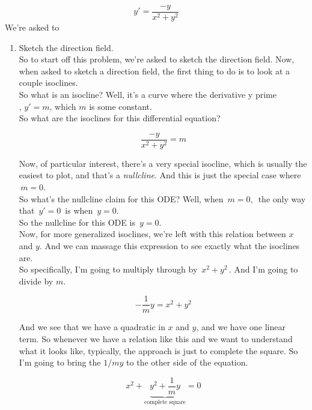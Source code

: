 \begin{equation*}
  y' = \frac{-y}{x^2 + y^2}
\end{equation*}
We're asked to

\begin{enumerate}
\item Sketch the direction field. \\
  So to start off this problem, we're
  asked to sketch the direction field.
  Now, when asked to sketch a direction field,
  the first thing to do is to look at a couple isoclines.\\
  So what is an isocline?
  Well, it's a curve where the derivative y
  prime $,\,y' = m, \,$which $m$ is some constant.\\
  So what are the isoclines for this differential equation?
  
  \begin{equation*}
    \frac{-y}{x^2 + y^2} = m 
  \end{equation*}

  Now, of particular interest, there's
  a very special isocline, which is usually the easiest to plot,
  and that's a \emph{nullcline}.
  And this is just the special case where $\, m = 0$.\\
  So what's the nullcline claim for this ODE?
  Well, when $\, m = 0, \,$ the only way that $\,y' = 0 \,$
  is when $\,y  = 0$.\\
  So the nullcline for this ODE is $\,y = 0$. \\
  Now, for more generalized isoclines,
  we're left with this relation between $x$ and $y$.
  And we can massage this expression to see exactly what the isoclines are.\\
  So specifically, I'm going to multiply through
  by $\, x^2 + y^2\,$.
  And I'm going to divide by $m$.
  
  \begin{equation*}
    -\frac{1}{m}y = x^2 + y^2
  \end{equation*}
  
  And we see that we have a quadratic in $x$ and $y$, and we have one linear term.
  So whenever we have a relation like this
  and we want to understand what it looks like,
  typically, the approach is just to complete the square.
  So I'm going to bring the $1/m y$ to the other side of the equation.

  \begin{equation*}
    x^2 + \underbrace{y^2 + \frac{1}{m} y}_{\text{complete square}} = 0
  \end{equation*}
  

\end{enumerate}
